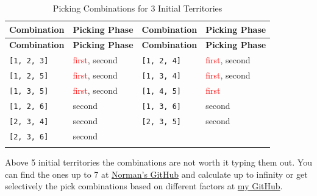 \small
\begin{longtable}{|p{2.5cm}|p{2.5cm}||p{2.5cm}|p{2.5cm}|}
\hline
\rowcolor{black!20}
\textbf{Combination} & \textbf{Picking Phase} & \textbf{Combination} & \textbf{Picking Phase} \\ \hline
\endfirsthead

\hline
\rowcolor{black!20}
\textbf{Combination} & \textbf{Picking Phase} & \textbf{Combination} & \textbf{Picking Phase} \\ \hline
\endhead

\texttt{[1, 2, 3]} & \textcolor{red}{first}, \textcolor{CustomBlue}{second} & \texttt{[1, 2, 4]} & \textcolor{red}{first}, \textcolor{CustomBlue}{second} \\ \hline
\texttt{[1, 2, 5]} & \textcolor{red}{first}, \textcolor{CustomBlue}{second} & \texttt{[1, 3, 4]} & \textcolor{red}{first}, \textcolor{CustomBlue}{second} \\ \hline
\texttt{[1, 3, 5]} & \textcolor{red}{first}, \textcolor{CustomBlue}{second} & \texttt{[1, 4, 5]} & \textcolor{red}{first} \\ \hline
\texttt{[1, 2, 6]} & \textcolor{CustomBlue}{second} & \texttt{[1, 3, 6]} & \textcolor{CustomBlue}{second} \\ \hline
\texttt{[2, 3, 4]} & \textcolor{CustomBlue}{second} & \texttt{[2, 3, 5]} & \textcolor{CustomBlue}{second} \\ \hline
\texttt{[2, 3, 6]} & \textcolor{CustomBlue}{second} & & \\ \hline

\caption{Picking Combinations for 3 Initial Territories}
\label{tab:3territories}
\end{longtable}

\normalsize

Above 5 initial territories the combinations are not worth it typing them out. You can find the ones up to 7 at \href{https://github.com/Norman1/WarLight-pick-combinations}{Norman's GitHub} and calculate up to infinity or get selectively the pick combinations based on different factors at \href{https://github.com/5siell/wz-random-code/blob/main/picks/pick_combinations.ipynb}{my GitHub}.